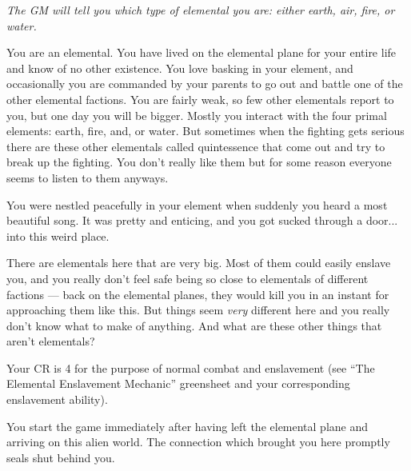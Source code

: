 \documentclass[char]{elementals}
\begin{document}
\name{\cNewElemental{}}

\emph{The GM will tell you which type of elemental you are: either earth, air, fire, or water.}

You are an elemental. You have lived on the elemental plane for your entire life and know of no other existence. You love basking in your element, and occasionally you are commanded by your parents to go out and battle one of the other elemental factions. You are fairly weak, so few other elementals report to you, but one day you will be bigger. Mostly you interact with the four primal elements: earth, fire, and, or water. But sometimes when the fighting gets serious there are these other elementals called quintessence that come out and try to break up the fighting. You don't really like them but for some reason everyone seems to listen to them anyways.

You were nestled peacefully in your element when suddenly you heard a most beautiful song.  It was pretty and enticing, and you got sucked through a door... into this weird place.

There are elementals here that are very big. Most of them could easily enslave you, and you really don't feel safe being so close to elementals of different factions --- back on the elemental planes, they would kill you in an instant for approaching them like this. But things seem \emph{very} different here and you really don't know what to make of anything. And what are these other things that aren't elementals?

Your CR is 4 for the purpose of normal combat and enslavement (see ``The Elemental Enslavement Mechanic'' greensheet and your corresponding enslavement ability).

You start the game immediately after having left the elemental plane and arriving on this alien world. The connection which brought you here promptly seals shut behind you.
\end{document}
